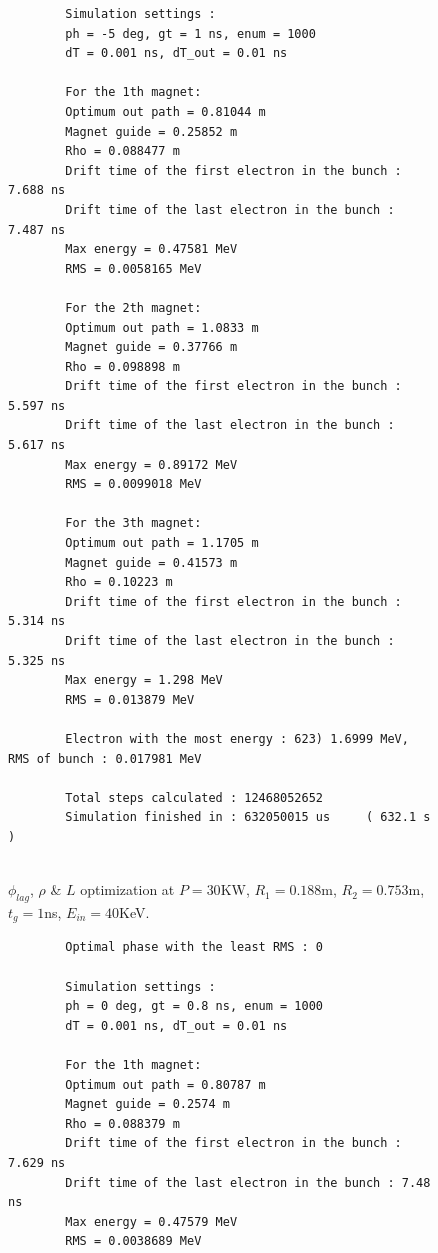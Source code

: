 \documentclass[a4paper,oneside,12pt]{report}
\numberwithin{equation}{chapter}
\begin{document}
{\begin{figure}[H]
\begin{verbatim}
        Simulation settings : 
        ph = -5 deg, gt = 1 ns, enum = 1000
        dT = 0.001 ns, dT_out = 0.01 ns
        
        For the 1th magnet:
        Optimum out path = 0.81044 m
        Magnet guide = 0.25852 m
        Rho = 0.088477 m
        Drift time of the first electron in the bunch : 7.688 ns
        Drift time of the last electron in the bunch : 7.487 ns
        Max energy = 0.47581 MeV
        RMS = 0.0058165 MeV
        
        For the 2th magnet:
        Optimum out path = 1.0833 m
        Magnet guide = 0.37766 m
        Rho = 0.098898 m
        Drift time of the first electron in the bunch : 5.597 ns
        Drift time of the last electron in the bunch : 5.617 ns
        Max energy = 0.89172 MeV
        RMS = 0.0099018 MeV
        
        For the 3th magnet:
        Optimum out path = 1.1705 m
        Magnet guide = 0.41573 m
        Rho = 0.10223 m
        Drift time of the first electron in the bunch : 5.314 ns
        Drift time of the last electron in the bunch : 5.325 ns
        Max energy = 1.298 MeV
        RMS = 0.013879 MeV

        Electron with the most energy : 623) 1.6999 MeV,	RMS of bunch : 0.017981 MeV
        
        Total steps calculated : 12468052652
        Simulation finished in : 632050015 us     ( 632.1 s )
        
    \end{verbatim}
    \vspace{0pt}
\caption{$\phi_{lag}$, $\rho$ \& $L$ optimization at $P=30$KW, $R_1=0.188$m, $R_2=0.753$m, $t_g=1$ns, $E_{in}=40$KeV.}
\label{fig:lout_opt_1ns_Erms}
\end{figure}

\begin{figure}[H]
    \centering
    \begin{verbatim}
        Optimal phase with the least RMS : 0

        Simulation settings : 
        ph = 0 deg, gt = 0.8 ns, enum = 1000
        dT = 0.001 ns, dT_out = 0.01 ns
        
        For the 1th magnet:
        Optimum out path = 0.80787 m
        Magnet guide = 0.2574 m
        Rho = 0.088379 m
        Drift time of the first electron in the bunch : 7.629 ns
        Drift time of the last electron in the bunch : 7.48 ns
        Max energy = 0.47579 MeV
        RMS = 0.0038689 MeV
        

\end{verbatim}
\end{figure}}
\end{document}
